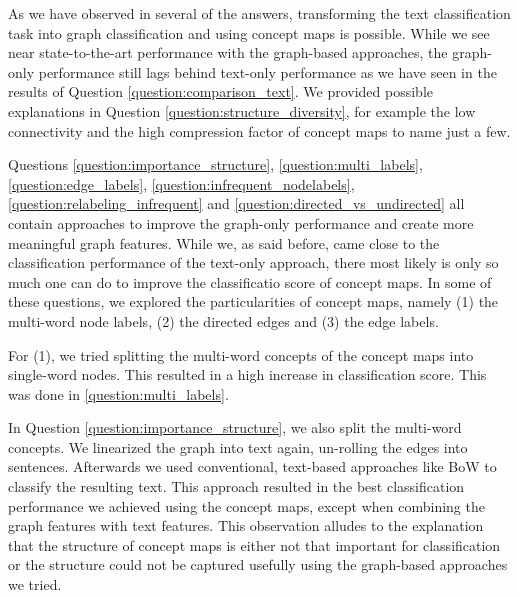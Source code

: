 











As we have observed in several of the answers, transforming the text classification task into graph classification and using concept maps is possible.
While we see near state-to-the-art performance with the graph-based approaches, the graph-only performance still lags behind text-only performance as we have seen in the results of Question \ref{question:comparison_text}.
We provided possible explanations in Question \ref{question:structure_diversity}, for example the low connectivity and the high compression factor of concept maps to name just a few.

Questions \ref{question:importance_structure}, \ref{question:multi_labels}, \ref{question:edge_labels}, \ref{question:infrequent_nodelabels}, \ref{question:relabeling_infrequent} and  \ref{question:directed_vs_undirected} all contain approaches to improve the graph-only performance and create more meaningful graph features.
While we, as said before, came close to the classification performance of the text-only approach, there most likely is only so much one can do to improve the classificatio score of concept maps.
In some of these questions, we explored the particularities of concept maps, namely (1) the multi-word node labels, (2) the directed edges and (3) the edge labels.

For (1), we tried splitting the multi-word concepts of the concept maps into single-word nodes.
This resulted in a high increase in classification score.
This was done in \ref{question:multi_labels}.

In Question \ref{question:importance_structure}, we also split the multi-word concepts. We linearized the graph into text again, un-rolling the edges into sentences. Afterwards we used conventional, text-based approaches like BoW to classify the resulting text.
This approach resulted in the best classification performance we achieved using the concept maps, except when combining the graph features with text features.
This observation alludes to the explanation that the structure of concept maps is either not that important for classification or the structure could not be captured usefully using the graph-based approaches we tried.

